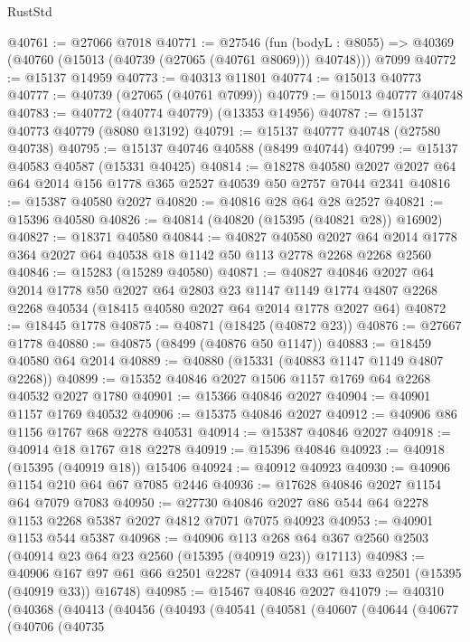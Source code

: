 \begin{lexlean}{RustStd}
\begin{coremodule}
@40761 := @27066 @7018
@40771 := @27546
    (fun (bodyL : @8055) => @40369 (@40760 (@15013 (@40739 (@27065 (@40761 @8069))) @40748)))
    @7099
@40772 := @15137 @14959
@40773 := @40313 @11801
@40774 := @15013 @40773
@40777 := @40739 (@27065 (@40761 @7099))
@40779 := @15013 @40777 @40748
@40783 := @40772 (@40774 @40779) (@13353 @14956)
@40787 := @15137 @40773 @40779 (@8080 @13192)
@40791 := @15137 @40777 @40748 (@27580 @40738)
@40795 := @15137 @40746 @40588 (@8499 @40744)
@40799 := @15137 @40583 @40587 (@15331 @40425)
@40814 := @18278 @40580 @2027 @2027 @64 @64 @2014 @156 @1778 @365 @2527 @40539 @50 @2757 @7044 @2341
@40816 := @15387 @40580 @2027
@40820 := @40816 @28 @64 @28 @2527
@40821 := @15396 @40580
@40826 := @40814 (@40820 (@15395 (@40821 @28)) @16902)
@40827 := @18371 @40580
@40844 := @40827
    @40580
    @2027
    @64
    @2014
    @1778
    @364
    @2027
    @64
    @40538
    @18
    @1142
    @50
    @113
    @2778
    @2268
    @2268
    @2560
@40846 := @15283 (@15289 @40580)
@40871 := @40827
    @40846
    @2027
    @64
    @2014
    @1778
    @50
    @2027
    @64
    @2803
    @23
    @1147
    @1149
    @1774
    @4807
    @2268
    @2268
    @40534
    (@18415 @40580 @2027 @64 @2014 @1778 @2027 @64)
@40872 := @18445 @1778
@40875 := @40871 (@18425 (@40872 @23))
@40876 := @27667 @1778
@40880 := @40875 (@8499 (@40876 @50 @1147))
@40883 := @18459 @40580 @64 @2014
@40889 := @40880 (@15331 (@40883 @1147 @1149 @4807 @2268))
@40899 := @15352 @40846 @2027 @1506 @1157 @1769 @64 @2268 @40532 @2027 @1780
@40901 := @15366 @40846 @2027
@40904 := @40901 @1157 @1769 @40532
@40906 := @15375 @40846 @2027
@40912 := @40906 @86 @1156 @1767 @68 @2278 @40531
@40914 := @15387 @40846 @2027
@40918 := @40914 @18 @1767 @18 @2278
@40919 := @15396 @40846
@40923 := @40918 (@15395 (@40919 @18)) @15406
@40924 := @40912 @40923
@40930 := @40906 @1154 @210 @64 @67 @7085 @2446
@40936 := @17628 @40846 @2027 @1154 @64 @7079 @7083
@40950 := @27730 @40846 @2027 @86 @544 @64 @2278 @1153 @2268 @5387 @2027 @4812 @7071 @7075 @40923
@40953 := @40901 @1153 @544 @5387
@40968 := @40906
    @113
    @268
    @64
    @367
    @2560
    @2503
    (@40914 @23 @64 @23 @2560 (@15395 (@40919 @23)) @17113)
@40983 := @40906
    @167
    @97
    @61
    @66
    @2501
    @2287
    (@40914 @33 @61 @33 @2501 (@15395 (@40919 @33)) @16748)
@40985 := @15467 @40846 @2027
@41079 := @40310
    (@40368
      (@40413
        (@40456
          (@40493
            (@40541
              (@40581
                (@40607
                  (@40644
                    (@40677
                      (@40706
                        (@40735

\end{coremodule}
\end{lexlean}
